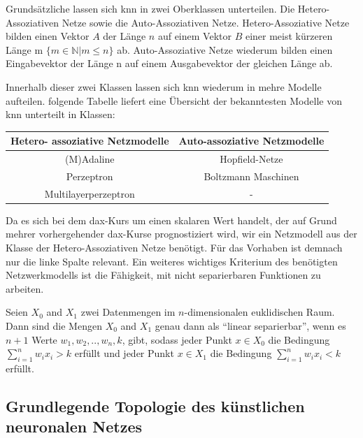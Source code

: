 Grundsätzliche lassen sich \ac{knn} in zwei Oberklassen unterteilen. Die Hetero-Assoziativen Netze sowie die Auto-Assoziativen Netze. Hetero-Assoziative Netze bilden einen Vektor $A$ der Länge $n$ auf einem Vektor $B$ einer meist kürzeren Länge m $\{m \in \mathbb{N} | m \le n\}$ ab. Auto-Assoziative Netze wiederum bilden einen Eingabevektor der Länge n auf einem Ausgabevektor der gleichen Länge ab.

Innerhalb dieser zwei Klassen lassen sich \ac{knn} wiederum in mehre Modelle aufteilen. folgende Tabelle liefert eine Übersicht der bekanntesten Modelle von \ac{knn} unterteilt in Klassen:

\begin{center}
\begin{tabular}{|c|c|}
\hline 
 Hetero- assoziative Netzmodelle & Auto-assoziative Netzmodelle \\ 
\hline 
(M)Adaline & Hopfield-Netze \\ 
\hline  
Perzeptron &  Boltzmann Maschinen \\ 
\hline 
Multilayerperzeptron & - \\ 
\hline 
\end{tabular} 
\end{center}

Da es sich bei dem \ac{dax}-Kurs um einen skalaren Wert handelt, der auf Grund mehrer vorhergehender \ac{dax}-Kurse prognostiziert wird, wir ein Netzmodell aus der Klasse der Hetero-Assoziativen Netze benötigt. Für das Vorhaben ist demnach nur die linke Spalte relevant. Ein weiteres wichtiges Kriterium des benötigten Netzwerkmodells ist die Fähigkeit, mit nicht separierbaren Funktionen zu arbeiten. 

Seien $X_{0}$ and $X_{1}$ zwei Datenmengen im $n$-dimensionalen euklidischen Raum. Dann sind die Mengen $X_{0}$ and $X_{1}$ genau dann als "`linear separierbar"', wenn es  $n+1$ Werte $w_{1}, w_{2},..,w_{n}, k$, gibt, sodass jeder Punkt  $x \in X_{0}$ die Bedingung $\sum^{n}_{i=1} w_{i}x_{i} > k$ erfüllt und jeder Punkt $x \in X_{1}$ die Bedingung $\sum^{n}_{i=1} w_{i}x_{i} < k$ erfüllt.

\subsection{Grundlegende Topologie des künstlichen neuronalen Netzes}
\label{subsection:Grundlegende Topologie des künstlichen neuronalen Netzes}


